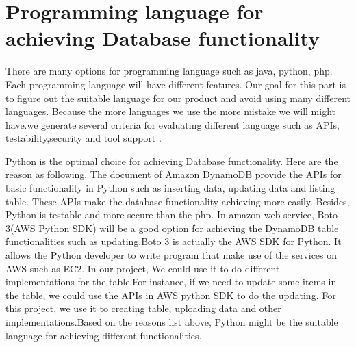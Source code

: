 \section{Programming language for achieving Database functionality}
        There are many options for programming language such as java, python, php. Each programming language will have different features. Our goal for this part is to figure out the suitable language for our product and avoid using many different languages. Because the more languages we use the more mistake we will might have.we generate several criteria for evaluating different language such as APIs, testability,security and tool support .

        \begin{table}[ht]
        \end{table}
                
        \noindent Python is the optimal choice for achieving Database functionality. Here are the reason as following. The document of Amazon DynamoDB provide the APIs for basic functionality in Python such as inserting data, updating data and listing table. These APIs make the database functionality achieving more easily. Besides, Python is testable and more secure than the php. In amazon web service, Boto 3(AWS Python SDK) will be a good option for achieving the DynamoDB table functionalities such as updating.Boto 3 is actually the AWS SDK for Python. It allows the Python developer to write program that make use of the services on AWS such as EC2. In our project, We could use it to do different implementations for the table.For instance, if we need to update some items in the table, we could use the APIs in AWS python SDK to do the updating. For this project, we use it to creating table, uploading data and other implementations.Based on the reasons list above, Python might be the suitable language for achieving different functionalities.
